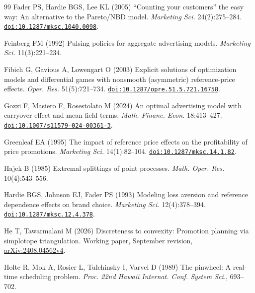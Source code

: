 \begin{thebibliography}{99}
Fader PS, Hardie BGS, Lee KL (2005) ``Counting your customers'' the easy way: An alternative to the {Pareto/NBD} model. \emph{Marketing Sci.} 24(2):275--284. \href{https://doi.org/10.1287/mksc.1040.0098}{\nolinkurl{doi:10.1287/mksc.1040.0098}}.

 {\color{black} Feinberg FM (1992) Pulsing policies for aggregate advertising models. \emph{Marketing Sci.} 11(3):221--234.}

Fibich G, Gavious A, Lowengart O (2003) Explicit solutions of optimization models and differential games with nonsmooth (asymmetric) reference-price effects. \emph{Oper. Res.} 51(5):721--734. \href{https://doi.org/10.1287/opre.51.5.721.16758}{\nolinkurl{doi:10.1287/opre.51.5.721.16758}}.


Gozzi F, Masiero F, Rosestolato M (2024) An optimal advertising model with carryover effect and mean field terms. \emph{Math. Financ. Econ.} 18:413--427. \href{https://doi.org/10.1007/s11579-024-00361-3}{\nolinkurl{doi:10.1007/s11579-024-00361-3}}.

Greenleaf EA (1995) The impact of reference price effects on the profitability of price promotions. \emph{Marketing Sci.} 14(1):82--104. \href{https://doi.org/10.1287/mksc.14.1.82}{\nolinkurl{doi:10.1287/mksc.14.1.82}}.

Hajek B (1985) Extremal splittings of point processes. \emph{Math. Oper. Res.} 10(4):543--556.

Hardie BGS, Johnson EJ, Fader PS (1993) Modeling loss aversion and reference dependence effects on brand choice. \emph{Marketing Sci.} 12(4):378--394. \href{https://doi.org/10.1287/mksc.12.4.378}{\nolinkurl{doi:10.1287/mksc.12.4.378}}.

He T, Tawarmalani M (2026) Discreteness to convexity: Promotion planning via simplotope triangulation. Working paper, September revision, \href{https://arxiv.org/abs/2408.04562v4}{arXiv:2408.04562v4}.





 {\color{black} Holte R, Mok A, Rosier L, Tulchinsky I, Varvel D (1989) The pinwheel: A real-time scheduling problem. \emph{Proc. 22nd Hawaii Internat. Conf. System Sci.}, 693--702.}


\end{thebibliography}
